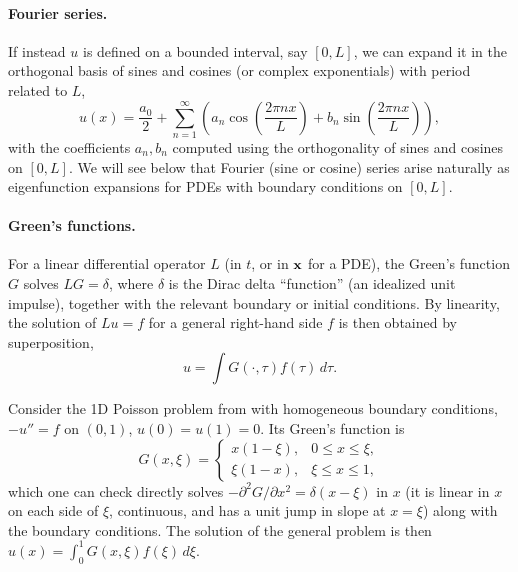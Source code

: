 \paragraph{Fourier series.}
If instead $u$ is defined on a bounded interval, say $[0,L]$, we can
expand it in the orthogonal basis of sines and cosines (or complex
exponentials) with period related to $L$,
\begin{equation*}
    u(x) = \frac{a_0}{2} + \sum_{n=1}^\infty \left( a_n \cos\left(
    \frac{2\pi n x}{L} \right) + b_n \sin\left( \frac{2\pi n x}{L}
    \right) \right),
\end{equation*}
with the coefficients $a_n, b_n$ computed using the orthogonality of
sines and cosines on $[0,L]$. We will see below that Fourier (sine or
cosine) series arise naturally as eigenfunction expansions for PDEs
with boundary conditions on $[0,L]$.

\paragraph{Green's functions.}
For a linear differential operator $L$ (in $t$, or in $\mathbf{x}$ for a
PDE), the Green's function $G$ solves $LG = \delta$, where $\delta$ is
the Dirac delta ``function'' (an idealized unit impulse), together with
the relevant boundary or initial conditions. By linearity, the solution
of $Lu = f$ for a general right-hand side $f$ is then obtained by
superposition,
\begin{equation*}
    u = \int G(\cdot, \tau) f(\tau) \, d\tau.
\end{equation*}

\begin{example}
    \label{ex:greens-function-poisson}
    Consider the 1D Poisson problem from  with
    homogeneous boundary conditions, $-u'' = f$ on $(0,1)$, $u(0) =
    u(1) = 0$. Its Green's function is
    \begin{equation*}
        G(x,\xi) = \begin{cases}
            x(1-\xi), & 0 \le x \le \xi, \\
            \xi(1-x), & \xi \le x \le 1,
        \end{cases}
    \end{equation*}
    which one can check directly solves $-\partial^2 G/\partial x^2 =
    \delta(x-\xi)$ in $x$ (it is linear in $x$ on each side of $\xi$,
    continuous, and has a unit jump in slope at $x=\xi$) along with the
    boundary conditions. The solution of the general problem is then
    $u(x) = \int_0^1 G(x,\xi) f(\xi) \, d\xi$.
\end{example}

